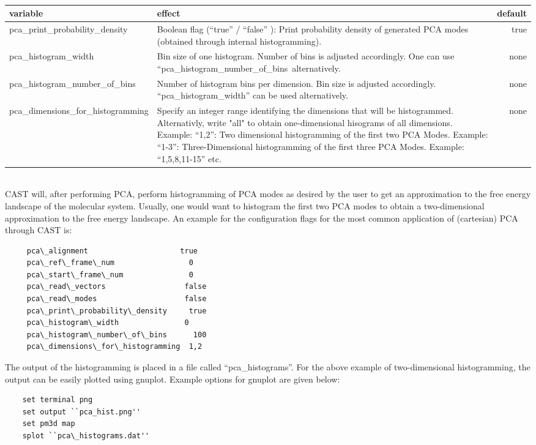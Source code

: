 \documentclass[10pt,a4paper]{article} %
\begin{document}
		~\\
		\begin{tabularx}{\textwidth}{l|X|r}
		variable & effect & default\\
		\hline
		pca\_print\_probability\_density & Boolean flag (``true'' / ``false'' ): Print probability density of generated PCA modes (obtained through internal histogramming). & true\\
		pca\_histogram\_width & Bin size of one histogram. Number of bins is adjusted accordingly. One can use ``pca\_histogram\_number\_of\_bins\ alternatively. & none\\
		pca\_histogram\_number\_of\_bins & Number of histogram bins per dimension. Bin size is adjusted accordingly. ``pca\_histogram\_width'' can be used alternatively. & none\\
		pca\_dimensions\_for\_histogramming & Specify an integer range identifying the dimensions that will be histogrammed. Alternativly, write "all" to obtain one-dimensional hisograms of all dimensions. Example: ``1,2'': Two dimensional histogramming of the first two \ac{PCA} Modes. Example: ``1-3'': Three-Dimensional histogramming of the first three \ac{PCA} Modes. Example: ``1,5,8,11-15'' etc.& none\\
		
	\end{tabularx}~\\
		
	 \ac{CAST} will, after performing \ac{PCA}, perform histogramming of \ac{PCA} modes as desired by the user to get an approximation to the free energy landscape of the molecular system. Usually, one would want to histogram the first two \ac{PCA} modes to obtain a two-dimensional approximation to the free energy landscape. An example for the configuration flags for the most common application of (cartesian) \ac{PCA} through \ac{CAST} is:\\
	 
	 \begin{lstlisting}
	 pca\_alignment                     true
	 pca\_ref\_frame\_num                 0
	 pca\_start\_frame\_num               0
	 pca\_read\_vectors                  false
	 pca\_read\_modes                    false
	 pca\_print\_probability\_density     true
	 pca\_histogram\_width               0
	 pca\_histogram\_number\_of\_bins      100
	 pca\_dimensions\_for\_histogramming  1,2\end{lstlisting}
	 
	 The output of the histogramming is placed in a file called ``pca\_histograms''. For the above example of two-dimensional histogramming, the output can be easily plotted using gnuplot\cite{gnuplot_4.4}. Example options for gnuplot are given below:\\
	 \begin{lstlisting}
	set terminal png
	set output ``pca_hist.png''
	set pm3d map
	splot ``pca\_histograms.dat''\end{lstlisting}~\\	
	
\end{document}
